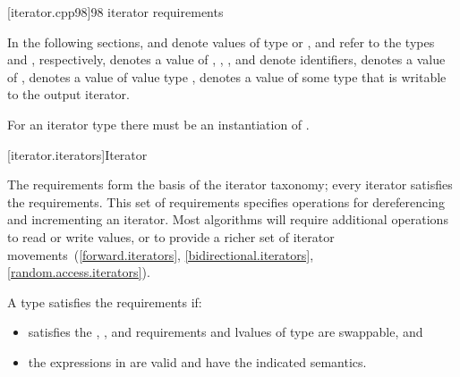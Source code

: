 \begin{addedblock}
[iterator.cpp98]{\Cpp{}98 iterator requirements}

\pnum
{}

\pnum
In the following sections,
and
denote values of type
 or ,
 and  refer to the
types  and
, respectively,
denotes a value of
,
,
,
and
denote identifiers,
denotes a value of
,
denotes a value of value type
,
denotes a value of some type that is writable to the output iterator.
\begin{note} For an iterator type  there must be an instantiation
of . \end{note}

\end{addedblock}

[iterator.iterators]{Iterator}

\pnum
The  requirements form the basis of the iterator
taxonomy; every iterator satisfies the  requirements. This
set of requirements specifies operations for dereferencing and incrementing
an iterator. Most algorithms will require additional operations to
read or write values, or
to provide a richer set of iterator movements~(\ref{forward.iterators},
\ref{bidirectional.iterators}, \ref{random.access.iterators}).

\pnum
A type  satisfies the  requirements if:

\begin{itemize}
\item {} satisfies the , , and
 requirements and lvalues
of type  are swappable, and

\item the expressions in  are valid and have
the indicated semantics.
\end{itemize}

